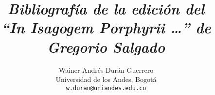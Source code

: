 \documentclass[12pt,
              article,
              oneside
              ]{memoir}
\title{\itshape Bibliografía de la edición del\\
  \enquote{In Isagogem Porphyrii \dots} de Gregorio Salgado}
\author{Wainer Andrés Durán Guerrero \\
  Universidad de los Andes, Bogotá \\
  \texttt{w.duran@uniandes.edu.co}
  }
\date{}
\begin{document}
\maketitle


\nocite{*}
\printbibliography
\end{document}
